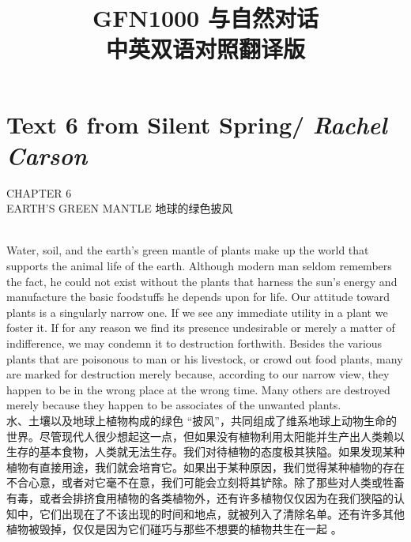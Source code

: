 \documentclass{article}
\begin{document}
\title{\textbf{
GFN1000 与自然对话\\
中英双语对照翻译版
}} %
\date{}
\maketitle %

\setcounter{secnumdepth}{0} %
\tableofcontents
\newpage
\section{Text 6 from Silent Spring/ \textit{Rachel Carson}}
\begin{center}
    CHAPTER 6\\
    EARTH’S GREEN MANTLE 地球的绿色披风\\
\end{center}

\\
Water, soil, and the earth’s green mantle of plants make up the world that supports the animal life of the earth. Although modern man seldom remembers the fact, he could not exist without the plants that harness the sun’s energy and manufacture the basic foodstuffs he depends upon for life. Our attitude toward plants is a singularly narrow one. If we see any immediate utility in a plant we foster it. If for any reason we find its presence undesirable or merely a matter of indifference, we may condemn it to destruction forthwith. Besides the various plants that are poisonous to man or his livestock, or crowd out food plants, many are marked for destruction merely because, according to our narrow view, they happen to be in the wrong place at the wrong time. Many others are destroyed merely because they happen to be associates of the unwanted plants.\\
水、土壤以及地球上植物构成的绿色 “披风”，共同组成了维系地球上动物生命的世界。尽管现代人很少想起这一点，但如果没有植物利用太阳能并生产出人类赖以生存的基本食物，人类就无法生存。我们对待植物的态度极其狭隘。如果发现某种植物有直接用途，我们就会培育它。如果出于某种原因，我们觉得某种植物的存在不合心意，或者对它毫不在意，我们可能会立刻将其铲除。除了那些对人类或牲畜有毒，或者会排挤食用植物的各类植物外，还有许多植物仅仅因为在我们狭隘的认知中，它们出现在了不该出现的时间和地点，就被列入了清除名单。还有许多其他植物被毁掉，仅仅是因为它们碰巧与那些不想要的植物共生在一起 。\\
\end{document}
